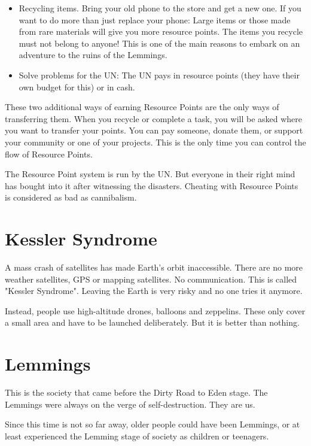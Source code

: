 \begin{itemize}
    \item Recycling items. Bring your old phone to the store and get a new one. If you want to do more than just replace your phone: Large items or those made from rare materials will give you more resource points. The items you recycle must not belong to anyone! This is one of the main reasons to embark on an adventure to the ruins of the Lemmings.
    \item Solve problems for the UN: The UN pays in resource points (they have their own budget for this) or in cash.
\end{itemize}

These two additional ways of earning Resource Points are the only ways of transferring them. When you recycle or complete a task, you will be asked where you want to transfer your points. You can pay someone, donate them, or support your community or one of your projects. This is the only time you can control the flow of Resource Points.

The Resource Point system is run by the UN. But everyone in their right mind has bought into it after witnessing the disasters. Cheating with Resource Points is considered as bad as cannibalism.



\section{Kessler Syndrome}
\label{sec: Kessler Syndrome}
A mass crash of satellites has made Earth's orbit inaccessible. There are no more weather satellites, GPS or mapping satellites. No communication.
This is called "Kessler Syndrome". Leaving the Earth is very risky and no one tries it anymore.

Instead, people use high-altitude drones, balloons and zeppelins. These only cover a small area and have to be launched deliberately. But it is better than nothing.

\section{Lemmings}
\label{sec:Lemmings}

This is the society that came before the Dirty Road to Eden stage. The Lemmings were always on the verge of self-destruction. They are us.

Since this time is not so far away, older people could have been Lemmings, or at least experienced the Lemming stage of society as children or teenagers.